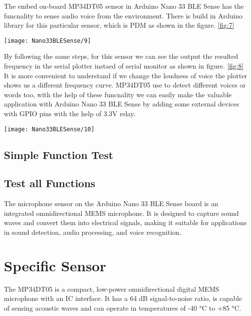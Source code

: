 The embed on-board MP34DT05 sensor in Arduino Nano 33 BLE Sense has the funcnality to sense audio voice from the environment. There is build in Arduino library for this particular sensor, which is PDM as shown in the figure.  \ref{fig:7}

\begin{center}
    \texttt{[image: Nano33BLESense/9]}
    \label{fig:7}
\end{center}

By following the same steps, for this sensor we can see the output the resulted frequency in the serial plotter instaed of serial monitor as shown in figure.  \ref{fig:8}  It is more convenient to understand if we change the loudness of voice the plotter shows us a different frequency curve. MP34DT05 use to detect different voices or words too, with the help of these funcnality we can easily make the valuable application with Arduino Nano 33 BLE Sense by adding some external devices with GPIO pins with the help of 3.3V relay.

\begin{center}
    \texttt{[image: Nano33BLESense/10]}
    \label{fig:8}
\end{center}

\subsection{Simple Function Test}

\subsection{Test all Functions}


The microphone sensor on the Arduino Nano 33 BLE Sense board is an integrated omnidirectional MEMS microphone. It is designed to capture sound waves and convert them into electrical signals, making it suitable for applications in sound detection, audio processing, and voice recognition.

\section{Specific Sensor}
The MP34DT05 is a compact, low-power omnidirectional digital MEMS microphone with an IC interface. It has a 64 dB signal-to-noise ratio, is capable of sensing acoustic waves and can operate in temperatures of -40 °C to +85 °C.

